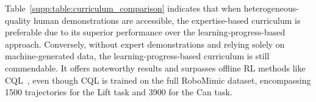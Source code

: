 Table~\ref{supp:table:curriculum_comparison} indicates that when heterogeneous-quality human demonstrations are accessible, the expertise-based curriculum is preferable due to its superior performance over the learning-progress-based approach. Conversely, without expert demonstrations and relying solely on machine-generated data, the learning-progress-based curriculum is still commendable. It offers noteworthy results and surpasses offline RL methods like CQL~\citep{kumar2020conservative}, even though CQL is trained on the full RoboMimic dataset, encompassing 1500 trajectories for the Lift task and 3900 for the Can task.

